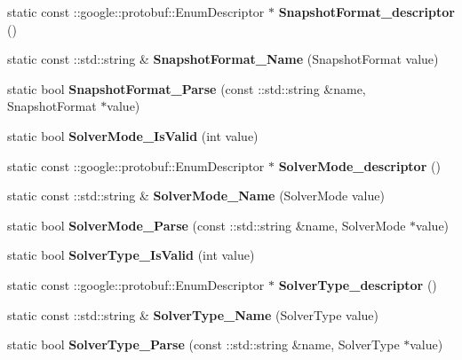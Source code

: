 \begin{DoxyCompactItemize}
static const \+::google\+::protobuf\+::\+Enum\+Descriptor $\ast$ {\bfseries Snapshot\+Format\+\_\+descriptor} ()
\item 
\mbox{\label{classcaffe_1_1_solver_parameter_a10226c8a375be9c14396d2ed6d70f8e8}} 
static const \+::std\+::string \& {\bfseries Snapshot\+Format\+\_\+\+Name} (Snapshot\+Format value)
\item 
\mbox{\label{classcaffe_1_1_solver_parameter_a8d7cee695c2204fad639fbeede1694ea}} 
static bool {\bfseries Snapshot\+Format\+\_\+\+Parse} (const \+::std\+::string \&name, Snapshot\+Format $\ast$value)
\item 
\mbox{\label{classcaffe_1_1_solver_parameter_accc886759efd0c26b86bdfd16019c86c}} 
static bool {\bfseries Solver\+Mode\+\_\+\+Is\+Valid} (int value)
\item 
\mbox{\label{classcaffe_1_1_solver_parameter_ab56fe719df1f48ca3ac3bdce9ee86b4e}} 
static const \+::google\+::protobuf\+::\+Enum\+Descriptor $\ast$ {\bfseries Solver\+Mode\+\_\+descriptor} ()
\item 
\mbox{\label{classcaffe_1_1_solver_parameter_a7d169f733f8bda0772027eff701156f7}} 
static const \+::std\+::string \& {\bfseries Solver\+Mode\+\_\+\+Name} (Solver\+Mode value)
\item 
\mbox{\label{classcaffe_1_1_solver_parameter_a2ef716bd536999679076f27c907d2008}} 
static bool {\bfseries Solver\+Mode\+\_\+\+Parse} (const \+::std\+::string \&name, Solver\+Mode $\ast$value)
\item 
\mbox{\label{classcaffe_1_1_solver_parameter_a18f929a286e48a0a17729dc559b3f531}} 
static bool {\bfseries Solver\+Type\+\_\+\+Is\+Valid} (int value)
\item 
\mbox{\label{classcaffe_1_1_solver_parameter_af1ca40cbaabe8eea4a87aa5cd3ba0995}} 
static const \+::google\+::protobuf\+::\+Enum\+Descriptor $\ast$ {\bfseries Solver\+Type\+\_\+descriptor} ()
\item 
\mbox{\label{classcaffe_1_1_solver_parameter_a320632f19040a5f7a150d5cd5d9dee88}} 
static const \+::std\+::string \& {\bfseries Solver\+Type\+\_\+\+Name} (Solver\+Type value)
\item 
\mbox{\label{classcaffe_1_1_solver_parameter_a688973aee2890ddb744a70b812cff1c1}} 
static bool {\bfseries Solver\+Type\+\_\+\+Parse} (const \+::std\+::string \&name, Solver\+Type $\ast$value)
\end{DoxyCompactItemize}
